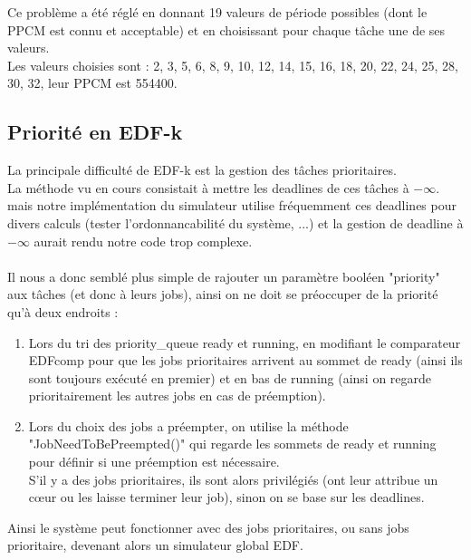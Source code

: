 \documentclass[a4paper,10pt]{article}
\begin{document}
		Ce problème a été réglé en donnant 19 valeurs de période possibles (dont le PPCM est connu et acceptable) et en choisissant pour chaque tâche une 			de ses valeurs.\\

		Les valeurs choisies sont : {2, 3, 5, 6, 8, 9, 10, 12, 14, 15, 16, 18, 20, 22, 24, 25, 28, 30, 32}, leur PPCM est 554400.

	\subsection{Priorité en EDF-k}\hypertarget{prioriteEDFk}{}

		La principale difficulté de EDF-k est la gestion des tâches prioritaires.\\
		La méthode vu en cours consistait à mettre les deadlines de ces tâches à $- \infty$. mais notre implémentation du simulateur utilise fréquemment ces deadlines pour divers calculs (tester l'ordonnancabilité du système, ...) et la gestion de deadline à $- \infty$ aurait rendu notre code trop complexe.\\
		~\\
		Il nous a donc semblé plus simple de rajouter un paramètre booléen "priority" aux tâches (et donc à leurs jobs), ainsi on ne doit se préoccuper de la priorité qu'à deux endroits :
		\begin{enumerate}
			\item Lors du tri des priority\_queue ready et running, en modifiant le comparateur EDFcomp pour que les jobs prioritaires arrivent au sommet de ready (ainsi ils sont toujours exécuté en premier) et en bas de running (ainsi on regarde prioritairement les autres jobs en cas de préemption).\\
			\item Lors du choix des jobs a préempter, on utilise la méthode "JobNeedToBePreempted()" qui regarde les sommets de ready et running pour définir si une préemption est nécessaire.\\
				S'il y a des jobs prioritaires, ils sont alors privilégiés (ont leur attribue un cœur ou les laisse terminer leur job), sinon on se base sur les deadlines.
		\end{enumerate}
		Ainsi le système peut fonctionner avec des jobs prioritaires, ou sans jobs prioritaire, devenant alors un simulateur global EDF.

\end{document}
